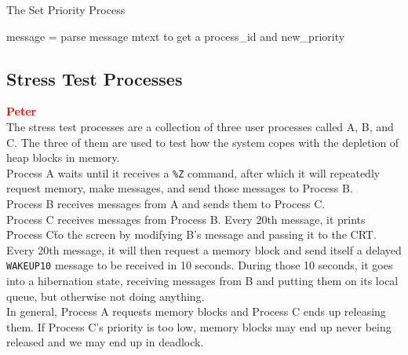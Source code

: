 \documentclass[12pt]{report}
\begin{document}
\begin{algorithm}
  \caption{The Set Priority Process}
  \begin{algorithmic}[1]
			\State message = 
			\State parse message mtext to get a process_id and new_priority
				\State {}
			\Else
			\EndIf
			\State {}
		\EndWhile
    \EndProcedure
  \end{algorithmic}
\end{algorithm}

\subsection{Stress Test Processes}

\textcolor{red}{\textbf{Peter}} \\

The stress test processes are a collection of three user processes called A, B, and C. The three of them are used to test how the system copes with the depletion of heap blocks in memory.\\

Process A waits until it receives a {\tt \%Z} command, after which it will repeatedly request memory, make messages, and send those messages to Process B.\\

Process B receives messages from A and sends them to Process C.\\

Process C receives messages from Process B. Every 20th message, it prints \"Process C\" to the screen by modifying B's message and passing it to the CRT. Every 20th message, it will then request a memory block and send itself a delayed {\tt WAKEUP10} message to be received in 10 seconds. During those 10 seconds, it goes into a hibernation state, receiving messages from B and putting them on its local queue, but otherwise not doing anything.\\

In general, Process A requests memory blocks and Process C ends up releasing them. If Process C's priority is too low, memory blocks may end up never being released and we may end up in deadlock.\\
\end{document}
